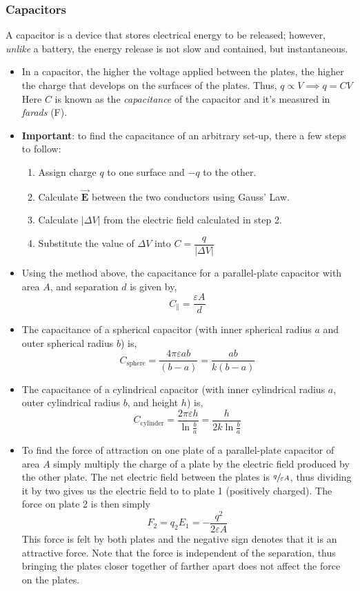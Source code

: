 \documentclass{scrartcl}
\begin{document}
    \subsubsection{Capacitors}
    \quad A capacitor is a device that stores electrical energy to be released; however, \textit{unlike} a battery, the energy release is not slow and contained, but instantaneous.
    \begin{itemize}
        \item In a capacitor, the higher the voltage applied between the plates, the higher the charge that develops on the surfaces of the plates. Thus, $q\propto V\implies\boxed{q=CV}$ Here $C$ is known as the \textit{capacitance} of the capacitor and it's measured in \textit{farads} (F).
        \item \textbf{Important}: to find the capacitance of an arbitrary set-up, there a few steps to follow:
        \begin{enumerate}
            \item Assign charge $q$ to one surface and $-q$ to the other.
            \item Calculate $\vec{\mathbf E}$ between the two conductors using Gauss' Law.
            \item Calculate $|\Delta V|$ from the electric field calculated in step 2.
            \item Substitute the value of $\Delta V$ into $C=\dfrac q{|\Delta V|}$
        \end{enumerate}
        \item Using the method above, the capacitance for a parallel-plate capacitor with area $A$, and separation $d$ is given by, \[C_\parallel=\frac{\varepsilon A}d\]
        \item The capacitance of a spherical capacitor (with inner spherical radius $a$ and outer spherical radius $b$) is, \[C_\text{sphere}=\frac{4\pi\varepsilon ab}{\left(b-a\right)}=\frac{ab}{k\left(b-a\right)}\]
        \item The capacitance of a cylindrical capacitor (with inner cylindrical radius $a$, outer cylindrical radius $b$, and height $h$) is, \[C_\text{cylinder}=\frac{2\pi\varepsilon h}{\ln\frac ba}=\frac{h}{2k\ln\frac ba}\]
        \item To find the force of attraction on one plate of a parallel-plate capacitor of area $A$ simply multiply the charge of a plate by the electric field produced by the other plate. The net electric field between the plates is $\sfrac{q}{\varepsilon A}$, thus dividing it by two gives us the electric field to to plate 1 (positively charged). The force on plate 2 is then simply \[F_2=q_2E_1=-\frac{q^2}{2\varepsilon A}\] This force is felt by both plates and the negative sign denotes that it is an attractive force. Note that the force is independent of the separation, thus bringing the plates closer together of farther apart does not affect the force on the plates.

\end{itemize}
\end{document}
